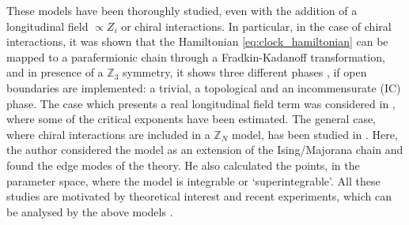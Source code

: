 These models have been thoroughly studied, even with the addition of a longitudinal field $\propto Z_i$ \cite{baxter1982exactlysm} or chiral interactions.
In particular, in the case of chiral interactions, it was shown \cite{fendley2012parafermions} that the Hamiltonian \eqref{eq:clock_hamiltonian} can be mapped to a parafermionic chain through a Fradkin-Kadanoff transformation, and in presence of a $\mathbb{Z}_3$ symmetry, it shows three different phases \cite{zhuang2015clock}, if open boundaries are implemented: a trivial, a topological and an incommensurate (IC) phase.
The case which presents a real longitudinal field term was considered in \cite{huang2019clock},  where some of the critical exponents have been estimated.
The general case, where chiral interactions are included in a $\mathbb{Z}_N$ model, has been studied in \cite{fendley2012parafermions}.
Here, the author considered the model as an extension of the Ising/Majorana chain and found the edge modes of the theory.
He also calculated the points, in the parameter space, where the model is integrable or `superintegrable'.
All these studies are motivated by theoretical interest and recent experiments, which can be analysed by the above models \cite{bernien2017probing}.


